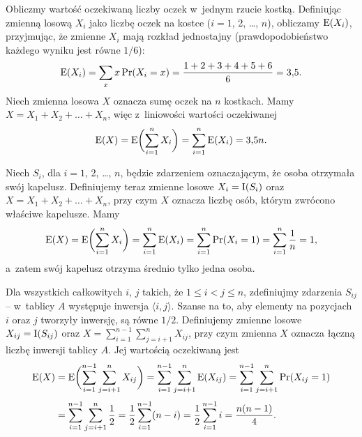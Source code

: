 \exercise %
Obliczmy wartość oczekiwaną liczby oczek w~jednym rzucie kostką.
Definiując zmienną losową $X_i$ jako liczbę oczek na  kostce ($i=1$, 2, \dots, $n$), obliczamy $\operatorname{E}(X_i)$, przyjmując, że zmienne $X_i$ mają rozkład jednostajny (prawdopodobieństwo każdego wyniku jest równe $1/6$):
\[
	\operatorname{E}(X_i) = \sum_xx\Pr(X_i=x) = \frac{1+2+3+4+5+6}{6} = 3{,}5.
\]
Niech zmienna losowa $X$ oznacza sumę oczek na $n$ kostkach.
Mamy $X=X_1+X_2+\dots+X_n$, więc z~liniowości wartości oczekiwanej
\[
	\operatorname{E}(X) = \operatorname{E}\biggl(\sum_{i=1}^nX_i\biggr) = \sum_{i=1}^n\operatorname{E}(X_i) = 3{,}5n.
\]

\exercise %
Niech $S_i$, dla $i=1$, 2, \dots, $n$, będzie zdarzeniem oznaczającym, że  osoba otrzymała swój kapelusz.
Definiujemy teraz zmienne losowe $X_i=\operatorname{I}(S_i)$ oraz $X=X_1+X_2+\dots+X_n$, przy czym $X$ oznacza liczbę osób, którym zwrócono właściwe kapelusze.
Mamy
\[
	\operatorname{E}(X) = \operatorname{E}\biggl(\sum_{i=1}^nX_i\biggr) = \sum_{i=1}^n\operatorname{E}(X_i) = \sum_{i=1}^n\Pr(X_i=1) = \sum_{i=1}^n\frac{1}{n} = 1,
\]
a~zatem swój kapelusz otrzyma średnio tylko jedna osoba.

\exercise %
Dla wszystkich całkowitych $i$, $j$ takich, że $1\le i<j\le n$, zdefiniujmy zdarzenia $S_{ij}$ -- w~tablicy $A$ występuje inwersja $\langle i,j\rangle$.
Szanse na to, aby elementy na pozycjach $i$ oraz $j$ tworzyły inwersję, są równe $1/2$.
Definiujemy zmienne losowe $X_{ij}=\operatorname{I}(S_{ij})$ oraz $X=\sum_{i=1}^{n-1}\sum_{j=i+1}^nX_{ij}$, przy czym zmienna $X$ oznacza łączną liczbę inwersji tablicy $A$.
Jej wartością oczekiwaną jest
\begin{align*}
	\operatorname{E}(X) &= \operatorname{E}\biggl(\sum_{i=1}^{n-1}\sum_{j=i+1}^nX_{ij}\biggr) = \sum_{i=1}^{n-1}\sum_{j=i+1}^n\operatorname{E}(X_{ij}) = \sum_{i=1}^{n-1}\sum_{j=i+1}^n\Pr(X_{ij}=1) \\[1mm]
	&= \sum_{i=1}^{n-1}\sum_{j=i+1}^n\frac{1}{2} = \frac{1}{2}\sum_{i=1}^{n-1}(n-i) = \frac{1}{2}\sum_{i=1}^{n-1}i = \frac{n(n-1)}{4}.
\end{align*}
